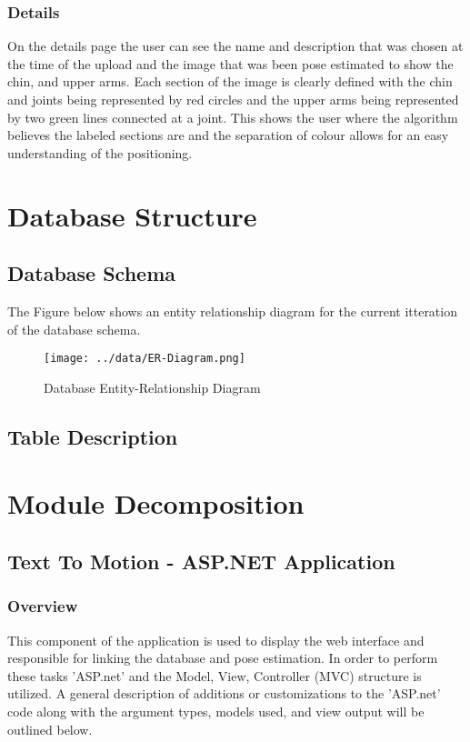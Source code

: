 \documentclass{scrreprt}
\begin{document}
\subsection{Details}
On the details page the user can see the name and description that was chosen at the time of the upload and the image that was been pose estimated to show the chin, and upper arms. Each section of the image is clearly defined with the chin and joints being represented by red circles and the upper arms being represented by two green lines connected at a joint. This shows the user where the algorithm believes the labeled sections are and the separation of colour allows for an easy understanding of the positioning. 

\chapter{Database Structure}

\section{Database Schema}
The Figure below shows an entity relationship diagram for the current itteration of the database schema.

\begin{figure}[!ht]
        \caption{Database Entity-Relationship Diagram}
        \label{erDiagram}
        \centering
        \texttt{[image: ../data/ER-Diagram.png]}
\end{figure}

\section{Table Description}

\chapter{Module Decomposition}

\section{Text To Motion - ASP.NET Application}


\subsection{Overview}
This component of the application is used to display the web interface and responsible for linking the database and pose estimation. In order to perform these tasks 'ASP.net' and the Model, View, Controller (MVC) structure is utilized. A general description of additions or customizations to the 'ASP.net' code along with the argument types, models used, and view output will be outlined below.
\end{document}
